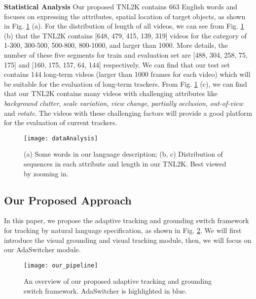 \documentclass[final]{cvpr}
\begin{document}
\textbf{Statistical Analysis}
Our proposed TNL2K contains 663 English words and focuses on expressing the attributes, spatial location of target objects, as shown in Fig. \ref{dataAnalysis} (a). For the distribution of length of all videos, we can see from Fig. \ref{dataAnalysis} (b) that the TNL2K contains [648, 479, 415, 139, 319] videos for the category of 1-300, 300-500, 500-800, 800-1000, and larger than 1000. More details, the number of these five segments for train and evaluation set are [488, 304, 258, 75, 175] and [160, 175, 157, 64, 144] respectively. We can find that our test set contains 144 long-term videos (larger than 1000 frames for each video) which will be suitable for the evaluation of long-term trackers. From Fig. \ref{dataAnalysis} (c), we can find that our TNL2K contains many videos with challenging attributes like \emph{background clutter}, \emph{scale variation}, \emph{view change},  \emph{partially occlusion}, \emph{out-of-view} and \emph{rotate}. The videos with these challenging factors will provide a good platform for the evaluation of current trackers. 

\begin{figure}[!htb]
\center
\texttt{[image: dataAnalysis]}
\caption{ (a) Some words in our language description; (b, c) Distribution of sequences in each attribute and length in our TNL2K. Best viewed by zooming in.}
\label{dataAnalysis}
\end{figure} 











\subsection{Our Proposed Approach}  

In this paper, we propose the adaptive tracking and grounding switch framework for tracking by natural language specification, as shown in Fig. \ref{pipeline}. We will first introduce the visual grounding and visual tracking module, then, we will focus on our AdaSwitcher module. 



\begin{figure}
\center
\texttt{[image: our\_pipeline]}
\caption{An overview of our proposed adaptive tracking and grounding switch framework. AdaSwitcher is highlighted in blue.}  
\label{pipeline}
\end{figure} 	
\end{document}

